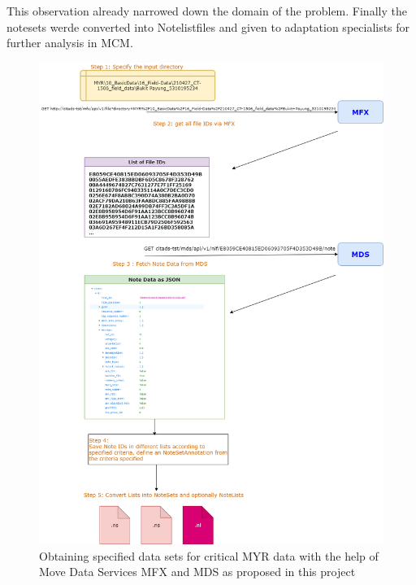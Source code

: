 This observation already narrowed down the domain of the problem.  Finally the notesets werde converted into Notelistfiles and given to adaptation specialists for further analysis in MCM. 
\begin{figure}[!htb]
 \includegraphics[width=0.75\linewidth]{images/ns_generation_myr.png}
 \caption{Obtaining specified data sets for critical MYR data with the help of Move Data Services MFX and MDS as proposed in this project}\label{fig:ns_generation_ew}
\end{figure}
